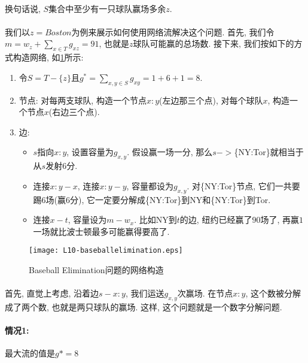        \paragraph{}换句话说, $S$集合中至少有一只球队赢场多余$z$.
        \paragraph{}我们以$z=Boston$为例来展示如何使用网络流解决这个问题. 首先, 我们令$m= w_z + \sum_{x\in T} g_{xz} = 91$, 也就是$z$球队可能赢的总场数. 接下来, 我们按如下的方式构造网络, 如\figurename\ref{Figure: matching_baseball_elimination_network}所示:
        \begin{enumerate}
 \item 令$S=T-\{z\}$且$g^*=\sum_{x,y\in S} g_{xy} = 1 + 6 + 1 = 8$.
 \item 节点: 对每两支球队, 构造一个节点${x:y}$(左边那三个点), 对每个球队$x$, 构造一个节点$x$(右边三个点).
 \item 边:
 	\begin{itemize}
 		\item $s$指向${x:y}$, 设置容量为$g_{x,y}$. 假设赢一场一分, 那么$s->$\{NY:Tor\}就相当于从$s$发射$6$分.
 		\item 连接$x:y-x$, 连接$x:y-y$, 容量都设为$g_{x,y}$. 对\{NY:Tor\}节点, 它们一共要踢$6$场(赢$6$分), 它一定要分解成\{NY:Tor\}到NY和\{NY:Tor\}到Tor.
 		\item 连接${x}-t$, 容量设为$m-{w_x}$. 比如NY到$t$的边, 纽约已经赢了$90$场了, 再赢$1$一场就比波士顿最多可能赢得要高了.
	\end{itemize}
        \end{enumerate}
        \begin{figure}[h]
            \centering
            \texttt{[image: L10-baseballelimination.eps]}
            \caption{{\sc Baseball Elimination}问题的网络构造}
            \label{Figure: matching_baseball_elimination_network}
        \end{figure}
        
        \paragraph{}首先, 直觉上考虑, 沿着边$s-{x:y}$, 我们运送$g_{x,y}$次赢场. 在节点$x:y$, 这个数被分解成了两个数, 也就是两只球队的赢场. 这样, 这个问题就是一个数字分解问题.
         \paragraph{情况1:}最大流的值是$g*=8$ 


